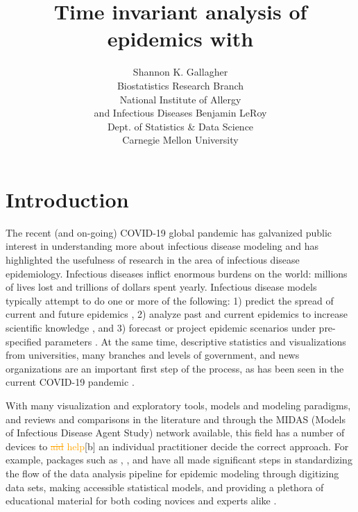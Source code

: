 \documentclass[
  shortnames]{jss}
\author{
Shannon K. Gallagher\\Biostatistics Research Branch\\
National Institute of Allergy\\
and Infectious Diseases \And Benjamin LeRoy\\Dept. of Statistics \& Data Science\\
Carnegie Mellon University
}
\title{Time invariant analysis of epidemics with \pkg{EpiCompare}}
\begin{document}
\newcommand{\shannon}[1]{\textcolor{orange}{#1}}
\newcommand{\shan}[1]{\textcolor{brown}{#1}}
\newcommand{\ben}[1]{\textcolor{violet}{#1}}

\newtheorem{theorem}{Theorem}

\section[Intro]{Introduction}\label{sec:intro}

The recent (and on-going) COVID-19 global pandemic has galvanized public
interest in understanding more about infectious disease modeling and has
highlighted the usefulness of research in the area of infectious disease
epidemiology. Infectious diseases inflict enormous burdens on the world:
millions of lives lost and trillions of dollars spent yearly. Infectious
disease models typically attempt to do one or more of the following: 1)
predict the spread of current and future epidemics
\citep[e.g. flu prediction][]{Biggerstaff2016}, 2) analyze past and
current epidemics to increase scientific knowledge
\citep[e.g. historical measle outbreaks][]{Neal2004}, and 3) forecast or
project epidemic scenarios under pre-specified parameters
\citep[e.g.][]{ferguson2020}. At the same time, descriptive statistics
and visualizations from universities, many branches and levels of
government, and news organizations are an important first step of the
process, as has been seen in the current COVID-19 pandemic
\citep{dong2020,cdc-covid-tracker2021,wp-covid-tracker2021}.

With many visualization and exploratory tools, models and modeling
paradigms, and reviews and comparisons in the literature and through the
MIDAS (Models of Infectious Disease Agent Study) network
\citep{midasnetwork2021} available, this field has a number of devices
to \textcolor{orange}{\sout{aid}} \textcolor{orange}{help}{[}b{]} an
individual practitioner decide the correct approach. For example,
 packages such as , , and
 have all made significant steps in standardizing the flow of
the data analysis pipeline for epidemic modeling through digitizing data
sets, making accessible statistical models, and providing a plethora of
educational material for both coding novices and experts alike
\citep{surveillance2017,Jenness2018,King2016}.
\end{document}
